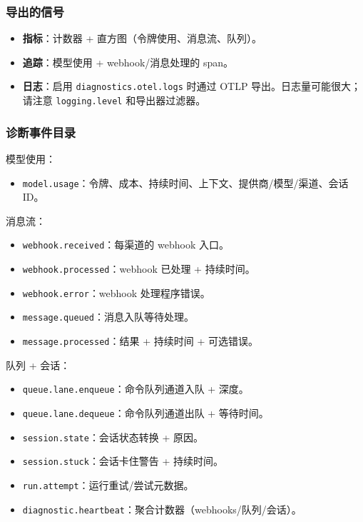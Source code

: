 \subsubsection{导出的信号}


\begin{itemize}
  \item \textbf{指标}：计数器 + 直方图（令牌使用、消息流、队列）。
  \item \textbf{追踪}：模型使用 + webhook/消息处理的 span。
  \item \textbf{日志}：启用 \texttt{diagnostics.otel.logs} 时通过 OTLP 导出。日志量可能很大；请注意 \texttt{logging.level} 和导出器过滤器。
\end{itemize}


\subsubsection{诊断事件目录}


模型使用：

\begin{itemize}
  \item \texttt{model.usage}：令牌、成本、持续时间、上下文、提供商/模型/渠道、会话 ID。
\end{itemize}


消息流：

\begin{itemize}
  \item \texttt{webhook.received}：每渠道的 webhook 入口。
  \item \texttt{webhook.processed}：webhook 已处理 + 持续时间。
  \item \texttt{webhook.error}：webhook 处理程序错误。
  \item \texttt{message.queued}：消息入队等待处理。
  \item \texttt{message.processed}：结果 + 持续时间 + 可选错误。
\end{itemize}


队列 + 会话：

\begin{itemize}
  \item \texttt{queue.lane.enqueue}：命令队列通道入队 + 深度。
  \item \texttt{queue.lane.dequeue}：命令队列通道出队 + 等待时间。
  \item \texttt{session.state}：会话状态转换 + 原因。
  \item \texttt{session.stuck}：会话卡住警告 + 持续时间。
  \item \texttt{run.attempt}：运行重试/尝试元数据。
  \item \texttt{diagnostic.heartbeat}：聚合计数器（webhooks/队列/会话）。
\end{itemize}


